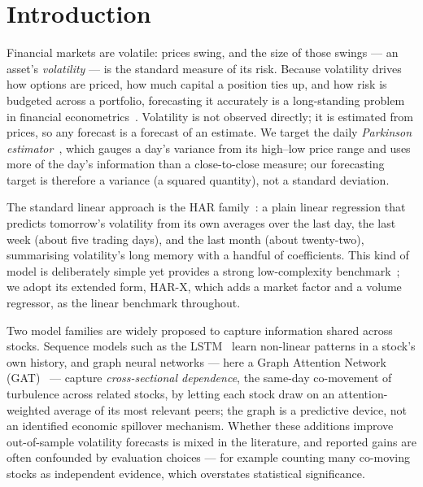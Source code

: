 \documentclass{llncs}
\begin{document}
\section{Introduction}
Financial markets are volatile: prices swing, and the size of those swings --- an asset's
\emph{volatility} --- is the standard measure of its risk. Because volatility drives how options
are priced, how much capital a position ties up, and how risk is budgeted across a portfolio,
forecasting it accurately is a long-standing problem in financial econometrics~\cite{corsi2009}.
Volatility is not observed directly; it is estimated from prices, so any forecast is a forecast of
an estimate. We target the daily \emph{Parkinson estimator}~\cite{parkinson1980}, which gauges a day's
variance from its high--low price range and uses more of the day's information than a close-to-close
measure; our
forecasting target is therefore a variance (a squared quantity), not a standard deviation.

The standard linear approach is the HAR family~\cite{corsi2009}: a plain linear regression that
predicts tomorrow's volatility from its own averages over the last day, the last week (about five
trading days), and the last month (about twenty-two), summarising volatility's long memory with a
handful of coefficients. This kind of model is deliberately simple yet provides a strong
low-complexity benchmark~\cite{corsi2009,audrino2025}; we adopt its extended form, HAR-X, which adds a
market factor and a volume regressor, as the linear benchmark throughout.

Two model families are widely proposed to capture information shared across stocks. Sequence models such as the
LSTM~\cite{lstm1997} learn non-linear patterns in a stock's own history, and graph neural networks
--- here a Graph Attention Network (GAT)~\cite{gat2018} --- capture \emph{cross-sectional dependence},
the same-day co-movement of turbulence across related stocks, by letting each stock draw on an
attention-weighted average of its most relevant peers; the graph is a predictive device, not an
identified economic spillover mechanism. Whether these additions improve
out-of-sample volatility forecasts is mixed in the literature, and reported gains are often
confounded by evaluation choices --- for example counting many co-moving stocks as independent
evidence, which overstates statistical significance.
\end{document}
